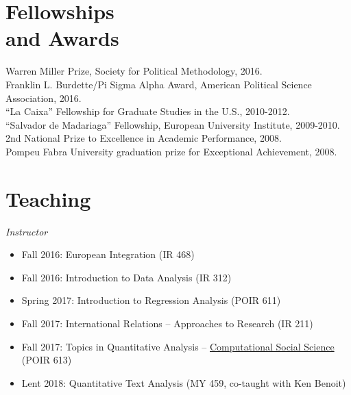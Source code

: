 \documentclass[margin,line,11pt]{resume}
\newcommand{\nl}{\vspace{0.10in}\\}
\begin{document}
\begin{resume}

    \section{\mysidestyle Fellowships\\ and Awards}
	Warren Miller Prize, Society for Political Methodology, 2016.\nl
    Franklin L. Burdette/Pi Sigma Alpha Award, American Political Science Association, 2016.\nl
	``La Caixa'' Fellowship for Graduate Studies in the U.S., 2010-2012. \nl
	``Salvador de Madariaga'' Fellowship, European University Institute, 2009-2010. \nl
	 2nd National Prize to Excellence in Academic Performance, 2008. \nl
	Pompeu Fabra University graduation prize for Exceptional Achievement, 2008.


\newpage     

            \section{\mysidestyle Teaching}

\emph{Instructor}
\begin{itemize}
\item Fall 2016: European Integration (IR 468)
\item Fall 2016: Introduction to Data Analysis (IR 312)
\item Spring 2017: Introduction to Regression Analysis (POIR 611)
\item Fall 2017: International Relations -- Approaches to Research (IR 211)
\item Fall 2017: Topics in Quantitative Analysis -- \href{http://pablobarbera.com/POIR613/}{Computational Social Science} (POIR 613)
\item Lent 2018: Quantitative Text Analysis (MY 459, co-taught with Ken Benoit)
\end{itemize}



\end{resume}
\end{document}
